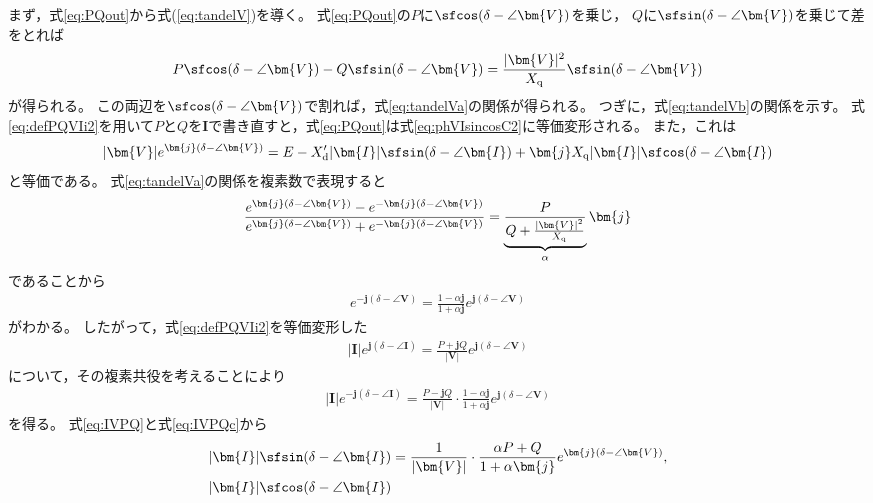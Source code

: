 \documentclass[tombow,dvipdfmx]{corona-a5-1.1}
\begin{document}
\begin{証明}
まず，式\ref{eq:PQout}から式(\ref{eq:tandelV})を導く。
式\ref{eq:PQout}の$P$に$\sfcos (\delta - \angle \bm{V})$を乗じ，
$Q$に$\sfsin (\delta - \angle \bm{V})$を乗じて差をとれば
\begin{align*}
P \sfcos (\delta - \angle \bm{V}) - Q \sfsin (\delta - \angle \bm{V})
= \frac{|\bm{V}|^2}{X_{\rm q}} \sfsin (\delta - \angle \bm{V}) 
\end{align*}
が得られる。
この両辺を$\sfcos (\delta - \angle \bm{V})$で割れば，式\ref{eq:tandelVa}の関係が得られる。
つぎに，式\ref{eq:tandelVb}の関係を示す。
式\ref{eq:defPQVIi2}を用いて$P$と$Q$を$\bm{I}$で書き直すと，式\ref{eq:PQout}は式\ref{eq:phVIsincosC2}に等価変形される。
また，これは
\begin{align}\label{eq:tmpVE}
|\bm{V}|e^{\bm{j}(\delta - \angle \bm{V})}=E
-X_{\rm d}' |\bm{I}| \sfsin (\delta - \angle \bm{I})
+ 
\bm{j} X_{\rm q} 
|\bm{I}| \sfcos (\delta - \angle \bm{I})
\end{align}
と等価である。
式\ref{eq:tandelVa}の関係を複素数で表現すると
\begin{align*}
\frac{ e^{\bm{j}(\delta - \angle \bm{V})} - e^{-\bm{j}(\delta - \angle \bm{V})}}
{e^{\bm{j}(\delta - \angle \bm{V})} + e^{-\bm{j}(\delta - \angle \bm{V})}}
= 
\underbrace{
\frac{P}{Q + \tfrac{ |\bm{V}|^2}{X_{\rm q}} }
}_{\alpha}
 \bm{j}
\end{align*}
であることから
\begin{align*}
e^{-\bm{j}(\delta - \angle \bm{V})} = \frac{1-\alpha \bm{j}}{1+\alpha \bm{j}}
e^{\bm{j}(\delta - \angle \bm{V})}
\end{align*}
がわかる。
したがって，式\ref{eq:defPQVIi2}を等価変形した
\begin{align}\label{eq:IVPQ}
|\bm{I}|e^{\bm{j}(\delta - \angle \bm{I})} = \frac{P+\bm{j}Q}{|\bm{V}|}  
e^{\bm{j}(\delta - \angle \bm{V})}
\end{align}
について，その複素共役を考えることにより
\begin{align}\label{eq:IVPQc}
|\bm{I}|e^{-\bm{j}(\delta - \angle \bm{I})} = \frac{P-\bm{j}Q}{|\bm{V}|}  
\cdot \frac{1-\alpha \bm{j}}{1+\alpha \bm{j}}
e^{\bm{j}(\delta - \angle \bm{V})}
\end{align}
を得る。
式\ref{eq:IVPQ}と式\ref{eq:IVPQc}から
\begin{align*}
|\bm{I}| \sfsin (\delta - \angle \bm{I})
& =
\frac{1}{|\bm{V}|} \cdot
\frac{\alpha P +Q}{ 1+\alpha \bm{j} }e^{\bm{j}(\delta - \angle \bm{V})}, \\
|\bm{I}| \sfcos (\delta - \angle \bm{I})

\end{align*}
\end{証明}
\end{document}
